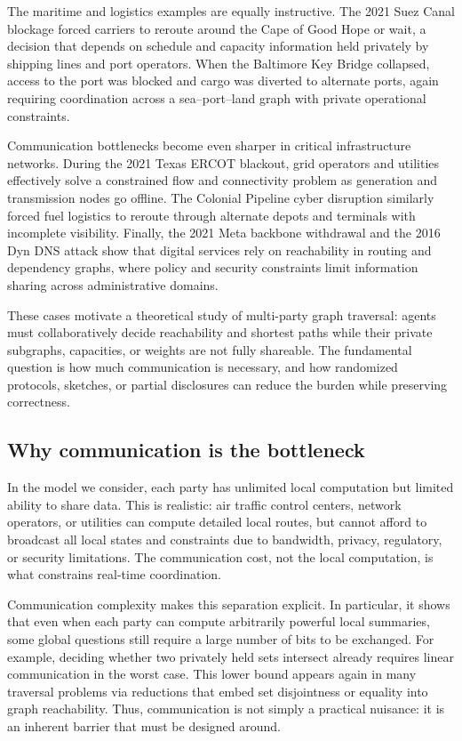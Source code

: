 The maritime and logistics examples are equally instructive. The 2021 Suez Canal blockage forced carriers to reroute around the Cape of Good Hope or wait, a decision that depends on schedule and capacity information held privately by shipping lines and port operators. When the Baltimore Key Bridge collapsed, access to the port was blocked and cargo was diverted to alternate ports, again requiring coordination across a sea--port--land graph with private operational constraints.

Communication bottlenecks become even sharper in critical infrastructure networks. During the 2021 Texas ERCOT blackout, grid operators and utilities effectively solve a constrained flow and connectivity problem as generation and transmission nodes go offline. The Colonial Pipeline cyber disruption similarly forced fuel logistics to reroute through alternate depots and terminals with incomplete visibility. Finally, the 2021 Meta backbone withdrawal and the 2016 Dyn DNS attack show that digital services rely on reachability in routing and dependency graphs, where policy and security constraints limit information sharing across administrative domains.

These cases motivate a theoretical study of multi-party graph traversal: agents must collaboratively decide reachability and shortest paths while their private subgraphs, capacities, or weights are not fully shareable. The fundamental question is how much communication is necessary, and how randomized protocols, sketches, or partial disclosures can reduce the burden while preserving correctness.



\subsection{Why communication is the bottleneck}
In the model we consider, each party has unlimited local computation but limited ability to share data. This is realistic: air traffic control centers, network operators, or utilities can compute detailed local routes, but cannot afford to broadcast all local states and constraints due to bandwidth, privacy, regulatory, or security limitations. The communication cost, not the local computation, is what constrains real-time coordination.

Communication complexity makes this separation explicit. In particular, it shows that even when each party can compute arbitrarily powerful local summaries, some global questions still require a large number of bits to be exchanged. For example, deciding whether two privately held sets intersect already requires linear communication in the worst case. This lower bound appears again in many traversal problems via reductions that embed set disjointness or equality into graph reachability. Thus, communication is not simply a practical nuisance: it is an inherent barrier that must be designed around.


